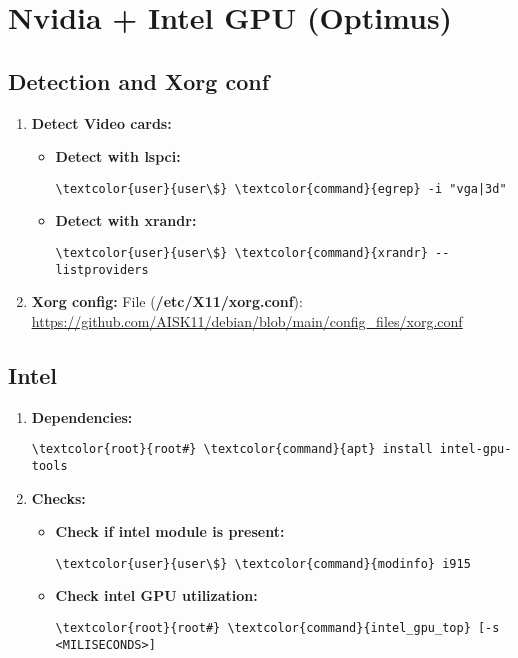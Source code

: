 \documentclass[10pt, a4paper, onecolumn, openany]{book} %
\begin{document}
\chapter{Nvidia + Intel GPU (Optimus)}
\section{Detection and Xorg conf}
\begin{enumerate}
    \item \textbf{Detect Video cards:}
\begin{itemize}
    \item \textbf{Detect with lspci:}
\begin{Verbatim}[commandchars=\\\{\}]
\textcolor{user}{user\$} \textcolor{command}{egrep} -i "vga|3d"
\end{Verbatim}
    \item \textbf{Detect with xrandr:}
\begin{Verbatim}[commandchars=\\\{\}]
\textcolor{user}{user\$} \textcolor{command}{xrandr} --listproviders
\end{Verbatim}
\end{itemize}
    \item \textbf{Xorg config:}
\newline File (\textbf{\textcolor{file}{/etc/X11/xorg.conf}}):
\newline \underline{\url{https://github.com/AISK11/debian/blob/main/config_files/xorg.conf}}
\end{enumerate}
\section{Intel}
\begin{enumerate}
    \item \textbf{Dependencies:}
\begin{Verbatim}[commandchars=\\\{\}]
\textcolor{root}{root#} \textcolor{command}{apt} install intel-gpu-tools
\end{Verbatim}
    \item \textbf{Checks:}
\begin{itemize}
    \item \textbf{Check if intel module is present:}
\begin{Verbatim}[commandchars=\\\{\}]
\textcolor{user}{user\$} \textcolor{command}{modinfo} i915
\end{Verbatim}
    \item \textbf{Check intel GPU utilization:}
\begin{Verbatim}[commandchars=\\\{\}]
\textcolor{root}{root#} \textcolor{command}{intel_gpu_top} [-s <MILISECONDS>]
\end{Verbatim}
\end{itemize}
\end{enumerate}
\end{document}
